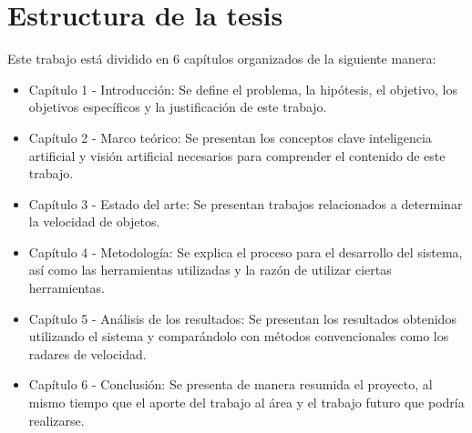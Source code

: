 \section{Estructura de la tesis}

Este trabajo está dividido en 6 capítulos organizados de la siguiente manera:


\begin{itemize}
\item Capítulo 1 - Introducción: Se define el problema, la hipótesis, el objetivo, los objetivos específicos y la justificación de este trabajo.

\item Capítulo 2 - Marco teórico: Se presentan los conceptos clave inteligencia artificial y visión artificial necesarios para comprender el contenido de este trabajo.

\item Capítulo 3 - Estado del arte: Se presentan trabajos relacionados a determinar la velocidad de objetos.

\item Capítulo 4 - Metodología: Se explica el proceso para el desarrollo del sistema, así como las herramientas utilizadas y la razón de utilizar ciertas herramientas.

\item Capítulo 5 - Análisis de los resultados: Se presentan los resultados obtenidos utilizando el sistema y comparándolo con métodos convencionales como los radares de velocidad.

\item Capítulo 6 - Conclusión: Se presenta de manera resumida el proyecto, al mismo tiempo que el aporte del trabajo al área y el trabajo futuro que podría realizarse.
\end{itemize}
